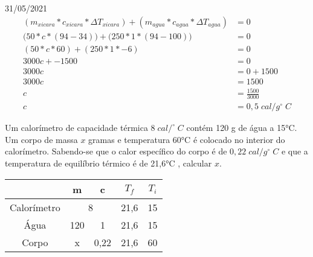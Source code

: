 \documentclass{SchoolBook}
\begin{document}
    \begin{day}{31/05/2021}
        \begin{align*}
            (m_{xicara} * c_{xicara} * \Delta T_{xicara}) +
            (m_{agua}   * c_{agua}   * \Delta T_{agua}  ) &= 0                   \\
        \Big(50         * c          * (94 - 34)    \Big) +
        \Big(250        * 1          * (94 - 100)   \Big) &= 0                   \\
            (50         * c          * 60               ) +
            (250        * 1          * -6               ) &= 0                   \\
                                            3000c + -1500 &= 0                   \\
                                                    3000c &= 0 + 1500            \\
                                                    3000c &= 1500                \\
                                                        c &= \frac{1500}{3000}   \\
                                                        c &= 0,5\;cal/g^\circ\;C
        \end{align*}
        
        Um calorímetro de capacidade térmica $8\;cal/^\circ\;C$ contém 120 g de água a 15°C. Um corpo de massa $x$ gramas e temperatura 60°C é colocado no interior do calorímetro. Sabendo-se que o calor específico do corpo é de $0,22\;cal/g^\circ\;C$ e que a temperatura de equilíbrio térmico é de 21,6°C , calcular $x$.
        
        \begin{center}
            \vspace{6pt}
            \begin{tabular}{|c|c|c|c|c|}\hline
                            & m          & c          & $T_f$ & $T_i$ \\\hline
                Calorímetro & \multicolumn{2}{|c|}{8} & 21,6  & 15    \\\hline
                Água        & 120        & 1          & 21,6  & 15    \\\hline
                Corpo       & x          & 0,22       & 21,6  & 60    \\\hline
            \end{tabular}
        \end{center}
        

\end{day}
\end{document}
